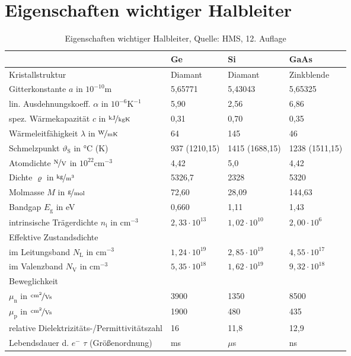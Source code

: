 	\section{Eigenschaften wichtiger Halbleiter}
		\begin{table}[here]
		\begin{tabularx}{\textwidth}{llll}
		& Ge & Si & GaAs\\
		\toprule
		Kristallstruktur & Diamant & Diamant & Zinkblende\\
		\midrule
		Gitterkonstante $a$ in $10^{-10}$m & 5,65771 & 5,43043 & 5,65325\\
		\midrule
		lin. Ausdehnungskoeff. $\alpha$ in $10^{-6}\mathrm{K}^{-1}$ & 5,90 & 2,56 & 6,86\\
		\midrule
		spez. Wärmekapazität $c$ in $\nicefrac{\mathrm{kJ}}{\mathrm{kgK}}$ & 0,31 & 0,70 & 0,35\\
		\midrule
		Wärmeleitfähigkeit $\lambda$ in $\nicefrac{\mathrm{W}}{\mathrm{mK}}$ & 64 & 145 & 46\\
		\midrule
		Schmelzpunkt $\vartheta_{\mathrm{S}}$ in °C (K) & 937 (1210,15) & 1415 (1688,15) & 1238 (1511,15)\\
		\midrule
		Atomdichte $\nicefrac{\mathrm{N}}{\mathrm{V}}$ in $10^{22}\mathrm{cm}^{-3}$ & 4,42 & 5,0 & 4,42\\
		\midrule
		Dichte $\varrho$ in $\nicefrac{\mathrm{kg}}{\mathrm{m}^3}$ & 5326,7 & 2328 & 5320\\
		\midrule
		Molmasse $M$ in $\nicefrac{\mathrm{g}}{\mathrm{mol}}$ & 72,60 & 28,09 & 144,63\\
		\midrule
		Bandgap $E_{\mathrm{g}}$ in eV & 0,660 & 1,11 & 1,43\\
		\midrule
		intrinsische Trägerdichte $n_{\mathrm{i}}$ in $\mathrm{cm}^{-3}$ & $2,33\cdot10^{13}$ & $1,02\cdot10^{10}$ & $2,00\cdot10^6$\\
		\midrule
		Effektive Zustandsdichte & &\\
		im Leitungsband $N_{\mathrm{L}}$ in $\mathrm{cm}^{-3}$ & $1,24\cdot10^{19}$ & $2,85\cdot10^{19}$ & $4,55\cdot10^{17}$\\
		im Valenzband $N_{\mathrm{V}}$ in $\mathrm{cm}^{-3}$ & $5,35\cdot10^{18}$ & $1,62\cdot10^{19}$ & $9,32\cdot10^{18}$\\
		\midrule
		Beweglichkeit & &\\
		$\mu_{\mathrm{n}}$ in $\nicefrac{\mathrm{cm}^2}{\mathrm{Vs}}$ & 3900 & 1350 & 8500\\
		$\mu_{\mathrm{p}}$ in $\nicefrac{\mathrm{cm}^2}{\mathrm{Vs}}$ & 1900 & 480 & 435\\
		\midrule
		relative Dielektrizitäts-/Permittivitätszahl & 16 & 11,8 & 12,9\\
		\midrule
		Lebendsdauer d. $e^-$ $\tau$ (Größenordnung) & ms & $\mu$s & ns\\
		\bottomrule
		\end{tabularx}
		\label{wichtige Halbleiter}
		\caption{Eigenschaften wichtiger Halbleiter, Quelle: HMS, 12. Auflage}
		\end{table}
